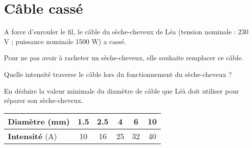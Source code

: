 \section{Câble cassé}

A force d'enrouler le fil, le câble du sèche-cheveux de Léa (tension nominale : 230 V ; puissance nominale \num{1500} W) a cassé.

Pour ne pas avoir à racheter un sèche-cheveux, elle souhaite remplacer ce câble.

\begin{questions}
	\question Quelle intensité traverse le câble lors du fonctionnement du sèche-cheveux ?
	
	\fillwithdottedlines{2cm}
	
	\question En déduire la  valeur minimale du diamètre de câble que Léà doit utiliser pour réparer son sèche-cheveux.
	
\begin{center}
		\begin{tabular}{|@{\ }l@{\ }|@{\ }c@{\ }|@{\ }c@{\ }|@{\ }c@{\ }|@{\ }c@{\ }|@{\ }c@{\ }|}
		\hline
		\textbf{Diamètre} (mm) & \num{1.5} & \num{2.5} & 4  & 6  & 10 \\ \hline
		\textbf{Intensité} (A) & 10        & 16        & 25 & 32 & 40 \\ \hline
	\end{tabular}
\end{center}

\fillwithdottedlines{1.5cm}
\end{questions}